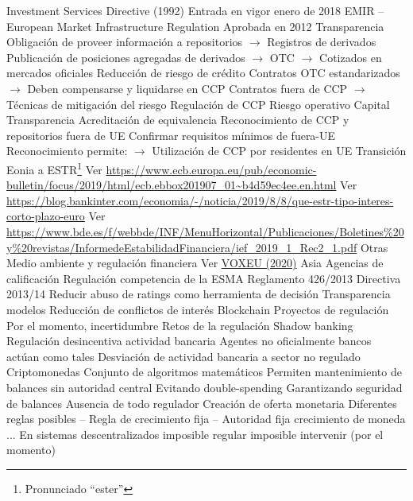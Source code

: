 \documentclass{nuevotema}
\begin{document}
\begin{esquemal}
				\4[] Investment Services Directive (1992)
				\4 Entrada en vigor enero de 2018
			\3 EMIR -- European Market Infrastructure Regulation
				\4 Aprobada en 2012
				\4 Transparencia
				\4[] Obligación de proveer información a repositorios
				\4[] $\to$ Registros de derivados
				\4[] Publicación de posiciones agregadas de derivados
				\4[] $\to$ OTC
				\4[] $\to$ Cotizados en mercados oficiales
				\4 Reducción de riesgo de crédito
				\4[] Contratos OTC estandarizados
				\4[] $\to$ Deben compensarse y liquidarse en CCP
				\4[] Contratos fuera de CCP
				\4[] $\to$ Técnicas de mitigación del riesgo
				\4 Regulación de CCP
				\4[] Riesgo operativo
				\4[] Capital
				\4[] Transparencia
				\4 Acreditación de equivalencia
				\4[] Reconocimiento de CCP y repositorios fuera de UE
				\4[] Confirmar requisitos mínimos de fuera-UE
				\4[] Reconocimiento permite:
				\4[] $\to$ Utilización de CCP por residentes en UE
			\3 Transición Eonia a ESTR\footnote{Pronunciado ``ester''}
				\4 Ver \url{https://www.ecb.europa.eu/pub/economic-bulletin/focus/2019/html/ecb.ebbox201907_01~b4d59ec4ee.en.html}
				\4 Ver \url{https://blog.bankinter.com/economia/-/noticia/2019/8/8/que-estr-tipo-interes-corto-plazo-euro}
				\4 Ver \url{https://www.bde.es/f/webbde/INF/MenuHorizontal/Publicaciones/Boletines\%20y\%20revistas/InformedeEstabilidadFinanciera/ief_2019_1_Rec2_1.pdf}
		\2 Otras
			\3 Medio ambiente y regulación financiera
				\4 Ver \href{https://voxeu.org/article/central-banks-and-climate-change}{VOXEU (2020)}
			\3 Asia
			\3 Agencias de calificación
				\4 Regulación competencia de la ESMA
				\4 Reglamento 426/2013
				\4 Directiva 2013/14
				\4 Reducir abuso de ratings como herramienta de decisión
				\4 Transparencia modelos
				\4 Reducción de conflictos de interés
			\3 Blockchain
				\4 Proyectos de regulación
				\4 Por el momento, incertidumbre
		\2 Retos de la regulación
			\3 Shadow banking
				\4 Regulación desincentiva actividad bancaria
				\4 Agentes no oficialmente bancos actúan como tales
				\4 Desviación de actividad bancaria a sector no regulado
			\3 Criptomonedas
				\4 Conjunto de algoritmos matemáticos
				\4 Permiten mantenimiento de balances sin autoridad central
				\4[] Evitando double-spending
				\4[] Garantizando seguridad de balances
				\4 Ausencia de todo regulador
				\4 Creación de oferta monetaria
				\4[] Diferentes reglas posibles
				\4[] -- Regla de crecimiento fija
				\4[] -- Autoridad fija crecimiento de moneda
				\4[] ...
				\4 En sistemas descentralizados
				\4[] imposible regular
				\4[] imposible intervenir (por el momento)

\end{esquemal}
\end{document}
